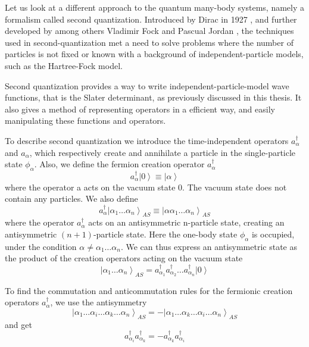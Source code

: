 Let us look at a different approach to the quantum many-body systems, namely a formalism called second quantization. Introduced by Dirac in 1927 \cite{DiracSQ}, and further developed by among others Vladimir Fock \cite{FockSQ} and Pascual Jordan \cite{JordanSQ}, the techniques used in second-quantization met a need to solve problems where the number of particles is not fixed or known with a background of independent-particle models, such as the Hartree-Fock model. 

Second quantization provides a way to write independent-particle-model wave functions, that is the Slater determinant, as previously discussed in this thesis. It also gives a method of representing operators in a efficient way, and easily manipulating these functions and operators.

To describe second quantization we introduce the time-independent operators $a^{\dagger}_{\alpha}$ and $a_{\alpha}$, which respectively create and annihilate a particle in the single-particle state $ \phi_{\alpha}$. Also, we define the fermion creation operator $a^{\dagger}_{\alpha}$
\[
	a_{\alpha}^{\dagger}\left|0\right\rangle \equiv\left|\alpha\right\rangle 
\]
where the operator a acts on the vacuum state 0. The vacuum state does not contain any particles. We also define 
\[
	a_{\alpha}^{\dagger}\left|\alpha_{1}\dots\alpha_{n}\right\rangle_{AS} \equiv\left|\alpha\alpha_{1}\dots\alpha_{n}\right\rangle_{AS}
\]
where the operator $a_{\alpha}^{\dagger}$ acts on an antisymmetric n-particle state, creating an antisymmetric $(n+1)$-particle state. Here the one-body state $\phi_{\alpha}$ is occupied, under the condition $\alpha\neq\alpha_{1}\dots\alpha_{n}$. We can thus express an antisymmetric state as the product of the creation operators acting on the vacuum state
\begin{equation}\label{eq:ASstateProduct}
	\left|\alpha_{1}\dots\alpha_{n}\right\rangle_{AS}=a_{\alpha_{1}}^{\dagger}a_{\alpha_{2}}^{\dagger}\dots a_{\alpha_{n}}^{\dagger}\left|0\right\rangle
\end{equation}

To find the commutation and anticommutation rules for the fermionic creation operators $a_{\alpha}^{\dagger}$, we use the antisymmetry
\[
	\left|\alpha_{1}\dots\alpha_{i}\dots\alpha_{k}\dots\alpha_{n}\right\rangle_{AS}=-\left|\alpha_{1}\dots\alpha_{k}\dots\alpha_{i}\dots\alpha_{n}\right\rangle_{AS}
\]
and get
\begin{equation}\label{eq:ASofStates}
	a_{\alpha_{i}}^{\dagger}a_{\alpha_{k}}^{\dagger}=-a_{\alpha_{k}}^{\dagger}a_{\alpha_{i}}^{\dagger}
\end{equation}


